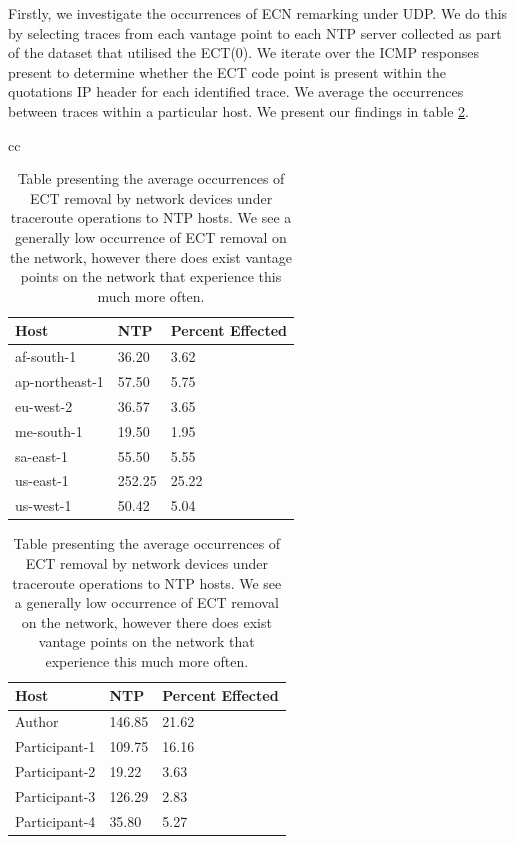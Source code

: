 \documentclass{l4proj}
\begin{document}
Firstly, we investigate the occurrences of ECN remarking under UDP. We do this by selecting traces from each vantage point to each NTP server collected as part of the dataset that utilised the ECT(0). We iterate over the ICMP responses present to determine whether the ECT code point is present within the quotations IP header for each identified trace. We average the occurrences between traces within a particular host. We present our findings in table \ref{tab:ntpect}.

\begin{table}[H]
\begin{tabular}{cc}
\begin{minipage}{.5\linewidth}
\begin{tabular}{|l|l|l|}
\hline
Host           & NTP    & Percent Effected \\ \hline
af-south-1     & 36.20  & 3.62             \\ \hline
ap-northeast-1 & 57.50  & 5.75             \\ \hline
eu-west-2      & 36.57  & 3.65             \\ \hline
me-south-1     & 19.50  & 1.95             \\ \hline
sa-east-1      & 55.50  & 5.55             \\ \hline
us-east-1      & 252.25 & 25.22            \\ \hline
us-west-1      & 50.42  & 5.04             \\ \hline
\end{tabular}
\end{minipage}

\begin{minipage}{.5\linewidth}
\begin{tabular}{|l|l|l|}
\hline
Host          & NTP    & Percent Effected \\ \hline
Author        & 146.85 & 21.62            \\ \hline
Participant-1 & 109.75 & 16.16            \\ \hline
Participant-2 & 19.22  & 3.63             \\ \hline
Participant-3 & 126.29 & 2.83            \\ \hline
Participant-4 & 35.80  & 5.27             \\ \hline
\end{tabular}
\end{minipage}
\end{tabular}

\caption{Table presenting the average occurrences of ECT removal by network devices under traceroute operations to NTP hosts. We see a generally low occurrence of ECT removal on the network, however there does exist vantage points on the network that experience this much more often.}
\label{tab:ntpect}

\end{table}
\end{document}
